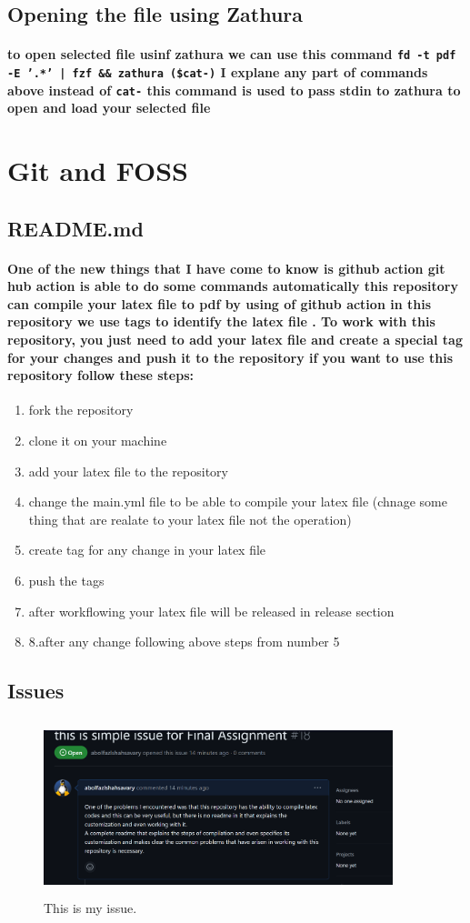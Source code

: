 \documentclass[12pt]{article}
\begin{document}
\subsection{Opening the file using Zathura}
\paragraph{to open selected file usinf zathura we can use this command \texttt{fd -t pdf -E '.*' | fzf \&\& zathura (\$cat-)}  I explane any part of commands above instead of \texttt{cat-} this command is used to pass stdin to zathura to open and load your selected file}
\section{Git and FOSS}
\subsection{README.md}
\paragraph{One of the new things that I have come to know is github action git hub action is able to do some commands automatically this repository can compile your latex file to pdf by using of github action in this repository we use tags to identify the latex file . To work with this repository, you just need to add your latex file and create a special tag for your changes and push it to the repository if you want to use this repository follow these steps:}
\begin{enumerate}
    \item fork the repository 
    \item clone it on your machine 
    \item add your latex file to the repository
    \item change the main.yml file to be able to compile your latex file (chnage some thing that are realate to your latex file not the operation) 
    \item create tag for any change in your latex file 
    \item push the tags 
    \item after workflowing your latex file will be released in release section 
    \item 8.after any change following above steps from number 5

\end{enumerate}
\subsection{Issues}
\begin{figure}[b]
    \centerline{\includegraphics[width=4in, height=2in]{issue.png}}
    \caption{This is my issue.}
    \label{fig}
\end{figure}
\end{document}
